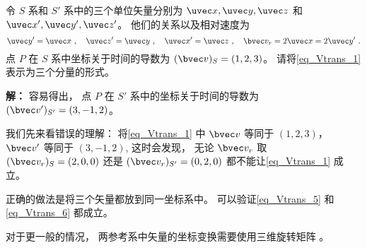 \begin{example}{}\label{ex_Vtrans_2}
令 $S$ 系和 $S'$ 系中的三个单位矢量分别为 $\uvec x, \uvec y, \uvec z$ 和 $\uvec x', \uvec y', \uvec z'$。 他们的关系以及相对速度为
\begin{equation}
\uvec y' = \uvec x~, \quad
\uvec z' = \uvec y~, \quad
\uvec x' = \uvec z~, \quad
\bvec v_r = 2\uvec x = 2\uvec y'~.
\end{equation}
点 $P$ 在 $S$ 系中坐标关于时间的导数为 $(\bvec v)_S = (1, 2, 3)$。 请将\autoref{eq_Vtrans_1} 表示为三个分量的形式。

\textbf{解：} 容易得出， 点 $P$ 在 $S'$ 系中的坐标关于时间的导数为 $(\bvec v')_{S'} = (3, -1, 2)$。

我们先来看错误的理解： 将\autoref{eq_Vtrans_1} 中 $\bvec v$ 等同于 $(1, 2, 3)$， $\bvec v'$ 等同于 $(3, -1, 2)$,  这时会发现， 无论 $\bvec v_r$ 取 $(\bvec v_r)_S = (2, 0, 0)$ 还是 $(\bvec v_r)_{S'} = (0, 2, 0)$ 都不能让\autoref{eq_Vtrans_1} 成立。

正确的做法是将三个矢量都放到同一坐标系中。 可以验证\autoref{eq_Vtrans_5} 和\autoref{eq_Vtrans_6} 都成立。

对于更一般的情况， 两参考系中矢量的坐标变换需要使用三维旋转矩阵 。
\end{example}
